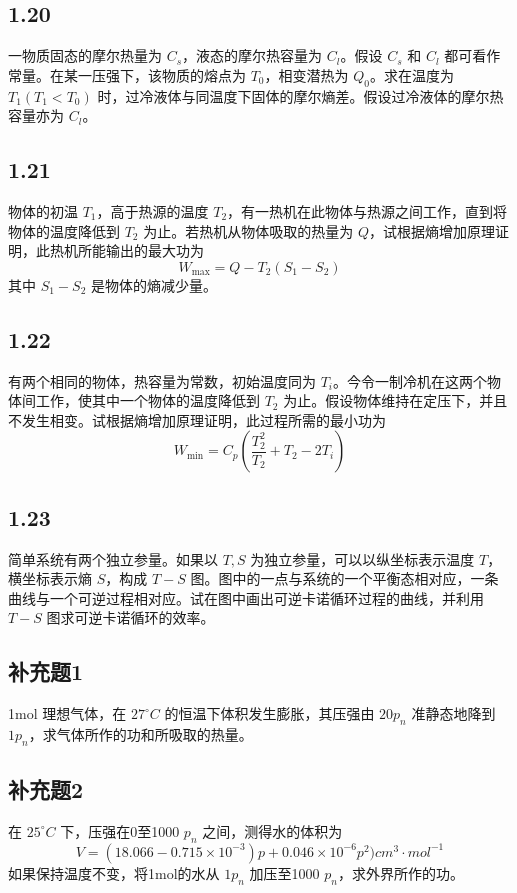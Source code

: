 \newpage
\subsection{1.20}
一物质固态的摩尔热量为 $C_s$，液态的摩尔热容量为 $C_l$。假设 $C_s$ 和 $C_l$ 都可看作常量。在某一压强下，该物质的熔点为 $T_0$，相变潜热为 $Q_0$。求在温度为 $T_1 (T_1 < T_0)$ 时，过冷液体与同温度下固体的摩尔熵差。假设过冷液体的摩尔热容量亦为 $C_l$。

\newpage
\subsection{1.21}
物体的初温 $T_1$，高于热源的温度 $T_2$，有一热机在此物体与热源之间工作，直到将物体的温度降低到 $T_2$ 为止。若热机从物体吸取的热量为 $Q$，试根据熵增加原理证明，此热机所能输出的最大功为
$$
W_{\max} = Q - T_2 (S_1 - S_2)
$$
其中 $S_1 - S_2$ 是物体的熵减少量。

\newpage
\subsection{1.22}
有两个相同的物体，热容量为常数，初始温度同为 $T_i$。今令一制冷机在这两个物体间工作，使其中一个物体的温度降低到 $T_2$ 为止。假设物体维持在定压下，并且不发生相变。试根据熵增加原理证明，此过程所需的最小功为
$$
W_{\min} = C_p \left( \frac{T_2^2}{T_2} + T_2 - 2T_i \right)
$$

\newpage
\subsection{1.23}
简单系统有两个独立参量。如果以 $T, S$ 为独立参量，可以以纵坐标表示温度 $T$，横坐标表示熵 $S$，构成 $T-S$ 图。图中的一点与系统的一个平衡态相对应，一条曲线与一个可逆过程相对应。试在图中画出可逆卡诺循环过程的曲线，并利用 $T-S$ 图求可逆卡诺循环的效率。

\newpage
\subsection{补充题1}
1mol 理想气体，在 $27^\circ C$ 的恒温下体积发生膨胀，其压强由 $20 p_n$ 准静态地降到 $1 p_n$，求气体所作的功和所吸取的热量。

\newpage
\subsection{补充题2}
在 $25^\circ C$ 下，压强在0至1000 $p_n$ 之间，测得水的体积为
$$
V = (18.066 - 0.715 \times 10^{-3}) p + 0.046 \times 10^{-6} p^2) cm^3 \cdot mol^{-1}
$$
如果保持温度不变，将1mol的水从 $1 p_n$ 加压至1000 $p_n$，求外界所作的功。

